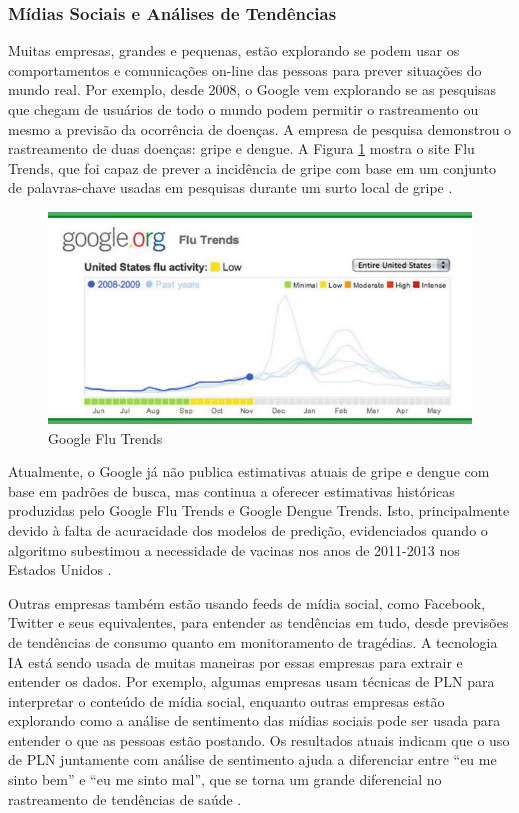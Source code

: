 \documentclass[
	12pt,				%
	openright,			%
	oneside,			%
	a4paper,			%
	english,			%
	spanish,			%
	brazil				%
	]{abntex2}
\begin{document}
	\subsubsection*{Mídias Sociais e Análises de Tendências}
	Muitas empresas, grandes e pequenas, estão explorando se podem usar os comportamentos e comunicações on-line das pessoas para prever situações do mundo real. Por exemplo, desde 2008, o Google vem explorando se as pesquisas que chegam de usuários de todo o mundo podem permitir o rastreamento ou mesmo a previsão da ocorrência de doenças. A empresa de pesquisa demonstrou o rastreamento de duas doenças: gripe e dengue. A Figura \ref{google_flu} mostra o site Flu Trends, que foi capaz de prever a incidência de gripe com base em um conjunto de palavras-chave usadas em pesquisas durante um surto local de gripe \cite{book_social_machines}.

\begin{figure}[!h]
\centering
\includegraphics{google_flu}
\caption{Google Flu Trends}
\label{google_flu}
\end{figure}


Atualmente, o Google já não publica estimativas atuais de gripe e dengue com base em padrões de busca, mas continua a oferecer estimativas históricas produzidas pelo Google Flu Trends e Google Dengue Trends. Isto, principalmente devido à falta de acuracidade dos modelos de predição, evidenciados quando o algoritmo subestimou a necessidade de vacinas nos anos de 2011-2013 nos Estados Unidos  \cite{article_google_flu}.

Outras empresas também estão usando feeds de mídia social, como Facebook, Twitter e seus equivalentes, para entender as tendências em tudo, desde previsões de tendências de consumo quanto em monitoramento de tragédias. A tecnologia IA está sendo usada de muitas maneiras por essas empresas para extrair e entender os dados. Por exemplo, algumas empresas usam técnicas de PLN para interpretar o conteúdo de mídia social, enquanto outras empresas estão explorando como a análise de sentimento das mídias sociais pode ser usada para entender o que as pessoas estão postando. Os resultados atuais indicam que o uso de PLN juntamente com análise de sentimento ajuda a diferenciar entre ``eu me sinto bem'' e ``eu me sinto mal'', que se torna um grande diferencial no rastreamento de tendências de saúde \cite{book_social_machines}.
	
\end{document}
